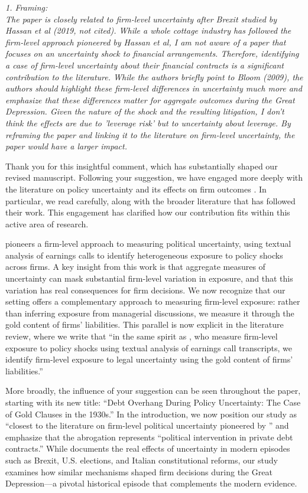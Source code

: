 \noindent \textit{\textcolor{red!60!black}{
1. Framing:\\
The paper is closely related to firm-level uncertainty after Brexit studied by Hassan et al (2019, not cited). While a whole cottage industry has followed the firm-level approach pioneered by Hassan et al, I am not aware of a paper that focuses on an uncertainty shock to financial arrangements. Therefore, identifying a case of firm-level uncertainty about their financial contracts is a significant contribution to the literature. While the authors briefly point to Bloom (2009), the authors should highlight these firm-level differences in uncertainty much more and emphasize that these differences matter for aggregate outcomes during the Great Depression. Given the nature of the shock and the resulting litigation, I don't think the effects are due to 'leverage risk' but to uncertainty about leverage. By reframing the paper and linking it to the literature on firm-level uncertainty, the paper would have a larger impact.
}}
 \bigskip

\noindent Thank you for this insightful comment, which has substantially shaped our revised manuscript. Following your suggestion, we have engaged more deeply with the literature on policy uncertainty and its effects on firm outcomes \citep{Bloom2009, Baker2016, Hassan2019}. In particular, we read \cite{Hassan2019} carefully, along with the broader literature that has followed their work. This engagement has clarified how our contribution fits within this active area of research.

\cite{Hassan2019} pioneers a firm-level approach to measuring political uncertainty, using textual analysis of earnings calls to identify heterogeneous exposure to policy shocks across firms. A key insight from this work is that aggregate measures of uncertainty can mask substantial firm-level variation in exposure, and that this variation has real consequences for firm decisions. We now recognize that our setting offers a complementary approach to measuring firm-level exposure: rather than inferring exposure from managerial discussions, we measure it through the gold content of firms' liabilities. This parallel is now explicit in the literature review, where we write that ``in the same spirit as \cite{Hassan2019}, who measure firm-level exposure to policy shocks using textual analysis of earnings call transcripts, we identify firm-level exposure to legal uncertainty using the gold content of firms' liabilities.''

More broadly, the influence of your suggestion can be seen throughout the paper, starting with its new title: ``Debt Overhang During Policy Uncertainty: The Case of Gold Clauses in the 1930s.'' In the introduction, we now position our study as ``closest to the literature on firm-level political uncertainty pioneered by \cite{Hassan2019}'' and emphasize that the abrogation represents ``political intervention in private debt contracts.'' While \cite{Hassan2019} documents the real effects of uncertainty in modern episodes such as Brexit, U.S. elections, and Italian constitutional reforms, our study examines how similar mechanisms shaped firm decisions during the Great Depression---a pivotal historical episode that complements the modern evidence.

